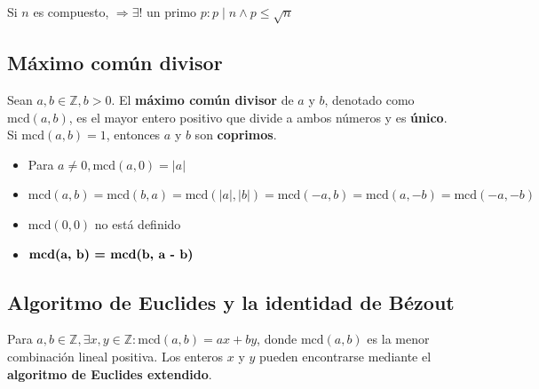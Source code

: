 \documentclass[12pt]{article}
\begin{document}

\begin{tcolorbox}[title=Número primos y compuestos]
    Si \( n \) es compuesto, \( \Rightarrow \exists ! \text{ un primo } p : p \mid n \land p \leq \sqrt{n} \)
\end{tcolorbox}

\newpage

\subsection*{Máximo común divisor}

\begin{tcolorbox}[title=Algoritmo de la división]
Sean \( a, b \in \mathbb{Z}, b > 0 \). El \textbf{máximo común divisor} de \( a \) y \( b \), denotado como \( \text{mcd}(a, b) \), es el mayor entero positivo que divide a ambos números y es \textbf{único}.
Si \( \text{mcd}(a, b) = 1 \), entonces \( a \) y \( b \) son \textbf{coprimos}.
\end{tcolorbox}

\begin{tcolorbox}[colback=yellow!15, title=Propiedades]
\begin{itemize}
    \item Para \( a \neq 0, \text{mcd}(a, 0) = |a| \)
    \item \( \text{mcd}(a, b) = \text{mcd}(b,a) = \text{mcd}(|a|, |b|) = \text{mcd}(-a, b) = \text{mcd}(a, -b) = \text{mcd}(-a, -b)\)
    \item \( \text{mcd}(0, 0) \) no está definido
    \item \( \textbf{\text{mcd}(a, b) = \text{mcd}(b, a - b)}\)
\end{itemize}
\end{tcolorbox}

\newpage

\subsection*{Algoritmo de Euclides y la identidad de Bézout}

\begin{tcolorbox}[title=Identidad de Bézout]
Para \( a, b \in \mathbb{Z}, \exists x, y \in \mathbb{Z} : \text{mcd}(a, b) = ax + by \), donde \( \text{mcd}(a, b) \) es la menor combinación lineal positiva.
Los enteros \( x \) y \( y \) pueden encontrarse mediante el \textbf{algoritmo de Euclides extendido}.
\end{tcolorbox}
\end{document}
